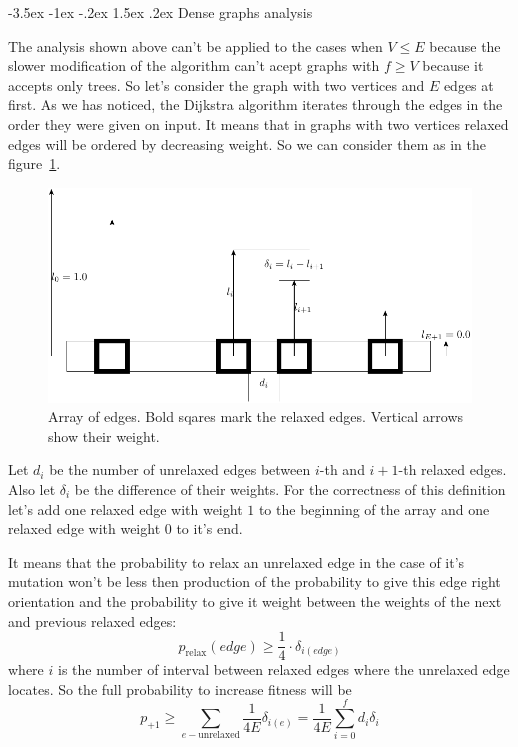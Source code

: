 \documentclass[a4paper,10pt]{article}
\makeatletter
\theoremstyle{definition}
\renewcommand\section{\@startsection {section}{1}{\z@}%
                                   {-3.5ex \@plus -1ex \@minus -.2ex}%
                                   {1.5ex \@plus.2ex}%
                                   {\large\bfseries}}
\makeatother
\begin{document}
\section{Dense graphs analysis}
\label{sec:4}

The analysis shown above can't be applied to the cases when $V \le E$ because the slower modification of the algorithm can't acept graphs with $f \ge V$ because it accepts only trees. So let's consider the graph with two vertices and $E$ edges at first. As we has noticed, the Dijkstra algorithm iterates through the edges in the order they were given on input. It means that in graphs with two vertices relaxed edges will be ordered by decreasing weight. So we can consider them as in the figure~\ref{edges}. 

\begin{figure}[ht]
\begin{center}
  \includegraphics[width=12cm]{pic/edges.pdf}
  \caption{Array of edges. Bold sqares mark the relaxed edges. Vertical arrows show their weight.}
  \label{edges}
 \end{center}
\end{figure}

Let $d_i$ be the number of unrelaxed edges between $i$-th and $i + 1$-th relaxed edges. Also let $\delta_i$ be the difference of their weights. For the correctness of this definition let's add one relaxed edge with weight $1$ to the beginning of the array and one relaxed edge with weight $0$ to it's end.

It means that the probability to relax an unrelaxed edge in the case of it's mutation won't be less then production of the probability to give this edge right orientation and the probability to give it weight between the weights of the next and previous relaxed edges:
$$p_\text{relax}(edge) \ge \frac{1}{4} \cdot \delta_{i(edge)}$$
where $i$ is the number of interval between relaxed edges where the unrelaxed edge locates. So the full probability to increase fitness will be
$$p_{+1} \ge \sum_{e - \text{unrelaxed}} \frac{1}{4E} \delta_{i(e)} =  \frac{1}{4E}\sum_{i = 0}^{f} d_i \delta_i$$
\end{document}
